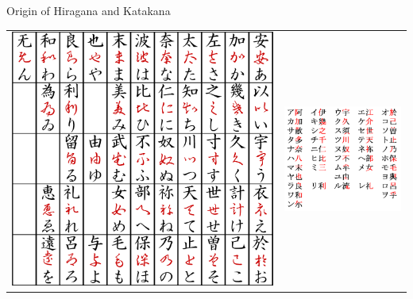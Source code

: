 \documentclass[12pt,aspectratio=169]{beamer}
\begin{document}
	\begin{frame}{Origin of Hiragana and Katakana}
		\begin{table}[ht]
			\centering
			\begin{tabular}{cc}
				\includegraphics[height=0.75\textheight]{images/Hiragana_origin.png} & \includegraphics[height=0.75\textheight]{images/Katakana_origin.png}
			\end{tabular}
		\end{table}
	\end{frame}
\end{document}

